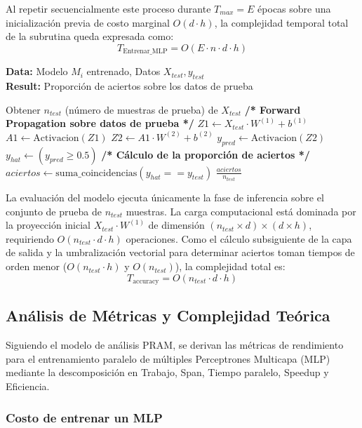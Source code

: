 \documentclass[11pt, a4paper]{article}
\begin{document}
Al repetir secuencialmente este proceso durante $T_{max} = E$ épocas sobre una inicialización previa de costo marginal $O(d \cdot h)$, la complejidad temporal total de la subrutina queda expresada como:
\[
T_{\text{Entrenar\_MLP}} = O(E \cdot n \cdot d \cdot h)
\]

\begin{algorithm}[H]
\caption{Evaluación del modelo (accuracy)}
\textbf{Data:} Modelo $M_i$ entrenado, Datos $X_{test}, y_{test}$\\
\textbf{Result:} Proporción de aciertos sobre los datos de prueba
\begin{algorithmic}[1]
    \State Obtener $n_{test}$ (número de muestras de prueba) de $X_{test}$
    \State \textbf{/* Forward Propagation sobre datos de prueba */}
    \State $Z1 \gets X_{test} \cdot W^{(1)} + b^{(1)}$
    \State $A1 \gets \text{Activacion}(Z1)$ 
    \State $Z2 \gets A1 \cdot W^{(2)} + b^{(2)}$ 
    \State $y_{pred} \gets \text{Activacion}(Z2)$
    \Statex
    \State $y_{hat} \gets (y_{pred} \ge 0.5)$
    \State \textbf{/* Cálculo de la proporción de aciertos */}
    \State $aciertos \gets \text{suma\_coincidencias}(y_{hat} == y_{test})$
    \State \Return $\frac{aciertos}{n_{test}}$
\end{algorithmic}
\end{algorithm}

La evaluación del modelo ejecuta únicamente la fase de inferencia sobre el conjunto de prueba de $n_{test}$ muestras. La carga computacional está dominada por la proyección inicial $X_{test} \cdot W^{(1)}$ de dimensión $(n_{test} \times d) \times (d \times h)$, requiriendo $O(n_{test} \cdot d \cdot h)$ operaciones. Como el cálculo subsiguiente de la capa de salida y la umbralización vectorial para determinar aciertos toman tiempos de orden menor ($O(n_{test} \cdot h)$ y $O(n_{test})$), la complejidad total es:
\[
T_{\text{accuracy}} = O(n_{test} \cdot d \cdot h)
\]


\subsection{Análisis de Métricas y Complejidad Teórica}

Siguiendo el modelo de análisis PRAM, se derivan las métricas de rendimiento para el entrenamiento paralelo de múltiples Perceptrones Multicapa (MLP) mediante la descomposición en Trabajo, Span, Tiempo paralelo, Speedup y Eficiencia.

\subsubsection{Costo de entrenar un MLP}
\end{document}
